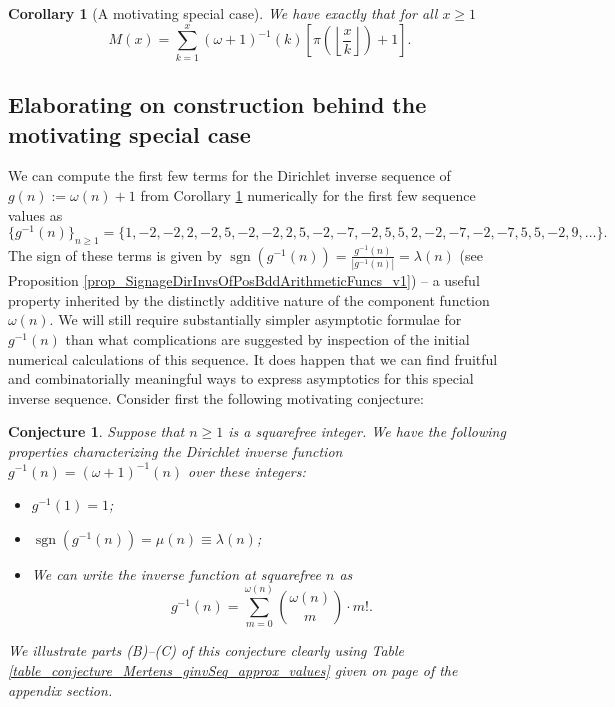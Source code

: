 \documentclass[11pt,reqno,a4letter]{article}
\numberwithin{figure}{section}
\numberwithin{table}{section}
\newcommand{\Floor}[2]{\ensuremath{\left\lfloor \frac{#1}{#2} \right\rfloor}}
\theoremstyle{plain}
\newtheorem{conjecture}[theorem]{Conjecture}
\newtheorem{cor}[theorem]{Corollary}
\numberwithin{theorem}{section}
\theoremstyle{definition}
\newcommand{\NBRef}[1]{
     \todo[linecolor=green!85!white,backgroundcolor=orange!50!white,bordercolor=blue!30!black,textcolor=cyan!15!black,shadow,size=\small,fancyline]{
     \color{NBRefColor}{\textbf{#1}
     }
     }
}
\begin{document}
\begin{cor}[A motivating special case] 
\label{cor_Mx_gInvnPixk_formula} 
We have exactly that for all $x \geq 1$ 
\begin{equation} 
\label{eqn_Mx_gInvnPixk_formula} 
M(x) = \sum_{k=1}^{x} (\omega+1)^{-1}(k) \left[\pi\left(\Floor{x}{k}\right) + 1\right]. 
\end{equation} 
\end{cor} 

\subsection{Elaborating on construction behind the motivating special case} 
\label{example_InvertingARecRelForMx_Intro}

We can compute the first few terms for the
Dirichlet inverse sequence of 
$g(n) := \omega(n) + 1$ from 
Corollary \ref{cor_Mx_gInvnPixk_formula} 
numerically for the first few sequence values as 
\[
\{g^{-1}(n)\}_{n \geq 1} = \{1, -2, -2, 2, -2, 5, -2, -2, 2, 5, -2, -7, -2, 5, 5, 2, -2, -7, -2, 
     -7, 5, 5, -2, 9, \ldots \}. 
\] 
The sign of these terms is given by $\operatorname{sgn}(g^{-1}(n)) = \frac{g^{-1}(n)}{|g^{-1}(n)|} = \lambda(n)$ 
(see Proposition \ref{prop_SignageDirInvsOfPosBddArithmeticFuncs_v1}) -- a useful property inherited by the distinctly 
additive nature of the component function $\omega(n)$. 
We will still require substantially simpler asymptotic formulae for $g^{-1}(n)$ than what 
complications are suggested by inspection of the initial 
numerical calculations of this sequence. It does happen that we can find fruitful and combinatorially meaningful 
ways to express asymptotics for this special inverse sequence. 
Consider first the following motivating conjecture: 
\NBRef{A01-2020-04-26}

\begin{conjecture}
\label{lemma_gInv_MxExample} 
Suppose that $n \geq 1$ is a squarefree integer. We have the following properties characterizing the 
Dirichlet inverse function $g^{-1}(n) = (\omega+1)^{-1}(n)$ over these integers: 
\begin{itemize} 

\item[(A)] $g^{-1}(1) = 1$; 
\item[(B)] $\operatorname{sgn}(g^{-1}(n)) = \mu(n) \equiv \lambda(n)$; 
\item[(C)] We can write the inverse function at squarefree $n$ as 
     \[
     g^{-1}(n) = \sum_{m=0}^{\omega(n)} \binom{\omega(n)}{m} \cdot m!. 
     \]
\end{itemize} 
We illustrate parts (B)--(C) of this conjecture clearly using 
Table \ref{table_conjecture_Mertens_ginvSeq_approx_values} given on 
page \pageref{table_conjecture_Mertens_ginvSeq_approx_values} of the appendix section. 
\end{conjecture} 
\end{document}
